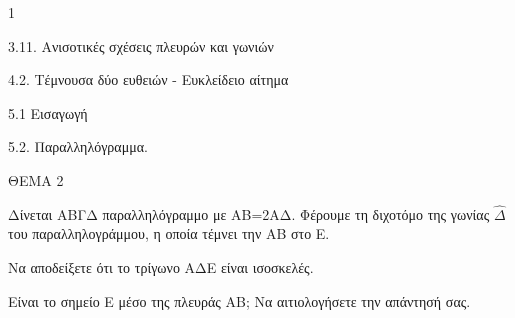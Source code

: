\begin{ylh}{1}
    \item 3.11. Ανισοτικές σχέσεις πλευρών και γωνιών
    \item 4.2. Τέμνουσα δύο ευθειών - Ευκλείδειο αίτημα
    \item 5.1 Εισαγωγή
    \item 5.2. Παραλληλόγραμμα.
\end{ylh}

ΘΕΜΑ 2

Δίνεται ΑΒΓΔ παραλληλόγραμμο με ΑΒ=2ΑΔ. Φέρουμε τη διχοτόμο της γωνίας $\widehat{\Delta}$ του παραλληλογράμμου, η οποία τέμνει την ΑΒ στο Ε.

\begin{center}
\end{center}

\begin{alist}
\item Να αποδείξετε ότι το τρίγωνο ΑΔΕ είναι ισοσκελές. 

\item Είναι το σημείο Ε μέσο της πλευράς ΑΒ; Να αιτιολογήσετε την απάντησή σας.

\end{alist}
